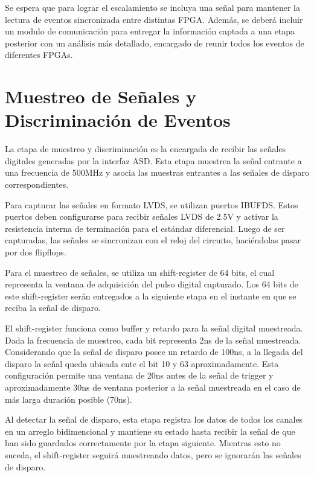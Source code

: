 Se espera que para lograr el escalamiento se incluya una señal para mantener la lectura de eventos sincronizada entre distintas FPGA. Además, se deberá incluir un modulo de comunicación para entregar la información captada a una etapa posterior con un análisis más detallado, encargado de reunir todos los eventos de diferentes FPGAs.

\section{Muestreo de Señales y Discriminación de Eventos}
\label{sec:sampling}

La etapa de muestreo y discriminación es la encargada de recibir las señales digitales generadas por la interfaz ASD. Esta etapa muestrea la señal entrante a una frecuencia de 500MHz y asocia las muestras entrantes a las señales de disparo correspondientes.

Para capturar las señales en formato LVDS, se utilizan puertos IBUFDS. Estos puertos deben configurarse para recibir señales LVDS de 2.5V y activar la resistencia interna de terminación para el estándar diferencial. Luego de ser capturadas, las señales se sincronizan con el reloj del circuito, haciéndolas pasar por dos flipflops.

Para el muestreo de señales, se utiliza un shift-register de 64 bits, el cual representa la ventana de adquisición del pulso digital capturado. Los 64 bits de este shift-register serán entregados a la siguiente etapa en el instante en que se reciba la señal de disparo. 

El shift-register funciona como buffer y retardo para la señal digital muestreada. Dada la frecuencia de muestreo, cada bit representa 2ns de la señal muestreada. Considerando que la señal de disparo posee un retardo de 100ns, a la llegada del disparo la señal queda ubicada ente el bit 10 y 63 aproximadamente. Esta configuración permite una ventana de 20ns antes de la señal de trigger y aproximadamente 30ns de ventana posterior a la señal muestreada en el caso de más larga duración posible (70ns).

Al detectar la señal de disparo, esta etapa registra los datos de todos los canales en un arreglo bidimencional y mantiene su estado hasta recibir la señal de que han sido guardados correctamente por la etapa siguiente. Mientras esto no suceda, el shift-register seguirá muestreando datos, pero se ignorarán las señales de disparo.




